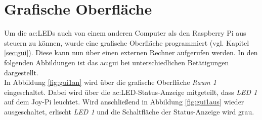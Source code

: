 \section{Grafische Oberfläche}
Um die \gls{ac:LED}s auch von einem anderen Computer als den Raspberry Pi aus steuern zu können, wurde eine grafische Oberfläche programmiert (vgl. Kapitel \ref{sec:gui}). Diese kann nun über einen externen Rechner aufgerufen werden. In den folgenden Abbildungen ist das \gls{ac:gui} bei unterschiedlichen Betätigungen dargestellt.\\[0.2cm]
In Abbildung \ref{fig:gui1an} wird über die grafische Oberfläche \textit{Raum 1} eingeschaltet. Dabei wird über die \gls{ac:LED}-Status-Anzeige mitgeteilt, dass \textit{LED 1} auf dem Joy-Pi leuchtet. Wird anschließend in Abbildung \ref{fig:gui1aus} wieder ausgeschaltet, erlischt \textit{LED 1} und die Schaltfläche der Status-Anzeige wird grau. 

\begin{figure}[H] %
\end{figure} %

\begin{figure}[H] %
\end{figure} %

